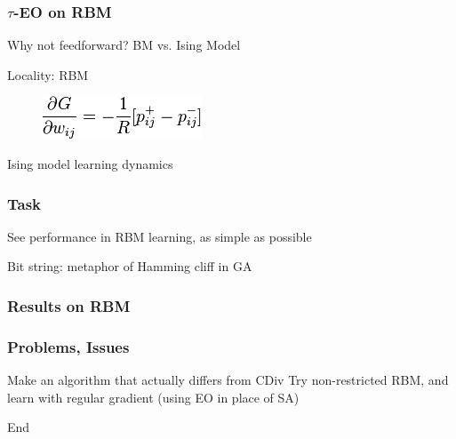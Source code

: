 \documentclass{beamer}
\begin{document}
\begin{frame}
  \frametitle{$\tau$-EO on RBM}
  Why not feedforward? BM vs. Ising Model

  Locality: RBM

  \begin{figure}
    \includegraphics{rbm_eq}
  \end{figure}

  Ising model learning dynamics

\end{frame}

\begin{frame}
  \frametitle{Task}
  See performance in RBM learning, as simple as possible

  Bit string: metaphor of Hamming cliff in GA

\end{frame}

\begin{frame}
  \frametitle{Results on RBM}
  
\end{frame}

\begin{frame}
  \frametitle{Problems, Issues}
  Make an algorithm that actually differs from CDiv
  Try non-restricted RBM, and learn with regular gradient
  (using EO in place of SA)
\end{frame}

\begin{frame}
  End

\end{frame}
\end{document}
